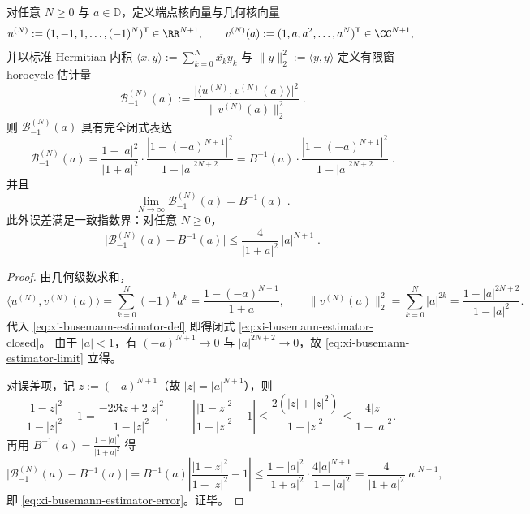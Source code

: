 \begin{theorem}\label{thm:xi-busemann-depth-finite-window-estimator}
对任意 \(N\ge 0\) 与 \(a\in\mathbb{D}\)，定义端点核向量与几何核向量
\[
u^{(N)}:=(1,-1,1,\dots,(-1)^N)^{\mathsf T}\in\RR^{N+1},
\qquad
v^{(N)}(a):=(1,a,a^2,\dots,a^N)^{\mathsf T}\in\CC^{N+1},
\]
并以标准 Hermitian 内积 \(\langle x,y\rangle:=\sum_{k=0}^{N}\overline{x_k}y_k\) 与 \(\|y\|_2^2:=\langle y,y\rangle\) 定义有限窗 horocycle 估计量
\begin{equation}\label{eq:xi-busemann-estimator-def}
\boxed{\;
\mathcal{B}^{(N)}_{-1}(a):=\frac{\bigl|\langle u^{(N)},v^{(N)}(a)\rangle\bigr|^2}{\|v^{(N)}(a)\|_2^2}\; }.
\end{equation}
则 \(\mathcal{B}^{(N)}_{-1}(a)\) 具有完全闭式表达
\begin{equation}\label{eq:xi-busemann-estimator-closed}
\boxed{\;
\mathcal{B}^{(N)}_{-1}(a)
=\frac{1-|a|^2}{|1+a|^2}\cdot\frac{|1-(-a)^{N+1}|^2}{1-|a|^{2N+2}}
=B^{-1}(a)\cdot\frac{|1-(-a)^{N+1}|^2}{1-|a|^{2N+2}}\; }.
\end{equation}
并且
\begin{equation}\label{eq:xi-busemann-estimator-limit}
\boxed{\;
\lim_{N\to\infty}\mathcal{B}^{(N)}_{-1}(a)=B^{-1}(a)\; }.
\end{equation}
此外误差满足一致指数界：对任意 \(N\ge 0\)，
\begin{equation}\label{eq:xi-busemann-estimator-error}
\boxed{\;
\bigl|\mathcal{B}^{(N)}_{-1}(a)-B^{-1}(a)\bigr|
\le \frac{4}{|1+a|^2}\,|a|^{N+1}\; }.
\end{equation}
\end{theorem}

\begin{proof}
由几何级数求和，
\[
\langle u^{(N)},v^{(N)}(a)\rangle=\sum_{k=0}^{N}(-1)^k a^k=\frac{1-(-a)^{N+1}}{1+a},
\qquad
\|v^{(N)}(a)\|_2^2=\sum_{k=0}^{N}|a|^{2k}=\frac{1-|a|^{2N+2}}{1-|a|^{2}}.
\]
代入 \eqref{eq:xi-busemann-estimator-def} 即得闭式 \eqref{eq:xi-busemann-estimator-closed}。
由于 \(|a|<1\)，有 \((-a)^{N+1}\to 0\) 与 \(|a|^{2N+2}\to 0\)，故 \eqref{eq:xi-busemann-estimator-limit} 立得。
\par
对误差项，记 \(z:=(-a)^{N+1}\)（故 \(|z|=|a|^{N+1}\)），则
\[
\frac{|1-z|^2}{1-|z|^2}-1
=\frac{-2\Re z+2|z|^2}{1-|z|^2},
\qquad
\left|\frac{|1-z|^2}{1-|z|^2}-1\right|
\le \frac{2(|z|+|z|^2)}{1-|z|^2}
\le \frac{4|z|}{1-|a|^2}.
\]
再用 \(B^{-1}(a)=\frac{1-|a|^2}{|1+a|^2}\) 得
\[
\bigl|\mathcal{B}^{(N)}_{-1}(a)-B^{-1}(a)\bigr|
=B^{-1}(a)\left|\frac{|1-z|^2}{1-|z|^2}-1\right|
\le \frac{1-|a|^2}{|1+a|^2}\cdot \frac{4|a|^{N+1}}{1-|a|^2}
=\frac{4}{|1+a|^2}|a|^{N+1},
\]
即 \eqref{eq:xi-busemann-estimator-error}。证毕。
\end{proof}

